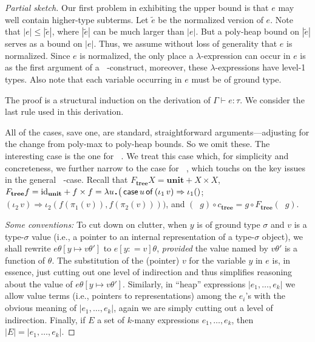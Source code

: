 \documentclass[envcountsame]{llncs}
\newcommand{\safe}[1]{#1^{\mathsf{S}}}
\newcommand{\key}[1]{\ensuremath{\mathop{\mathsf{#1}}\nolimits}\xspace}
\newcommand{\Case}{\key{case}}
\newcommand{\Of}{\key{of}}
\newcommand{\folds}[1]{\mathop{\safe{\mathsf{fold}}_{#1}}}
\newcommand{\type}[1]{\ensuremath{\mathbf{#1}}\xspace}
\newcommand{\Tree}{\type{tree}}
\newcommand{\Unit}{\ensuremath{\mathbf{unit}}\xspace}
\newcommand{\id}{\mathrm{id}}
\newcommand{\asize}[1]{\ensuremath{\mathopen{|}#1\mathclose{|}}\xspace}
\renewcommand{\gets}{\ensuremath{\mathrel{\colon=}}\xspace}
\newcommand{\entails}{\vdash}
\newcommand{\sqdot}{\rule{0.5mm}{0.5mm}}
\newcommand{\lam}[1]{\lambda #1\,\sqdot\,}
\newcommand{\of}{\colon}
\renewcommand{\colon}{\mathpunct{:}}
\begin{document}
\begin{proof}[Partial sketch]
Our first problem in exhibiting the upper bound is that $e$ may well 
contain higher-type subterms.  
Let $\tilde{e}$ be the normalized version of $e$.  Note
that $|e|\leq |\tilde{e}|$, where $|\tilde{e}|$ can be much larger
than $|e|$.  But a poly-heap bound on $|\tilde{e}|$ serves as a
bound on $|e|$.  Thus, we assume without loss of generality that
$e$ is normalized.
Since $e$ is normalized, the only place a $\lambda$-expression can 
occur in $e$ is
as the first argument of a $\folds{}$-construct, moreover, these
$\lambda$-expressions have level-1 types.
Also note that each variable occurring in $e$ must be of ground type.

The proof is a structural induction on the derivation of 
$\Gamma\entails e\of\tau$.  We consider the last rule
used in this derivation.  

All of the cases, save one, are standard, straightforward arguments---adjusting for the change from poly-max to poly-heap 
bounds.  So we omit these. The interesting case is the one for 
$\folds{\sigma}$.  We treat this case which, for simplicity 
and concreteness, we further narrow to the case for
$\folds{\Tree}$, which 
touchs on the key issues in the general $\folds{\sigma}$-case.
Recall that
$F_\Tree X = \Unit + X \times X$, \
$F_\Tree f = \id_{\Unit} + f\times f
= \lam{u}\big(\Case u \Of\,(\iota_1\, v) \Rightarrow \iota_1()$; 
$(\iota_2\, v) \Rightarrow \iota_2(f(\pi_1(v)),f(\pi_2(v)))\big)$,
and $(\folds{\Tree} g)\circ c_\Tree = g \circ F_\Tree(\folds\Tree g)$. 


\emph{Some conventions:}  To cut down on clutter, 
when $y$ is of ground type $\sigma$ and $v$ is a type-$\sigma$
value  (i.e., a pointer to an internal representation of 
a type-$\sigma$ object), we shall rewrite 
$e\theta[y\mapsto v\theta']$ to $e[y\gets v]\theta$, 
\emph{provided} the value named by $v\theta'$ is a function
of $\theta$.  The substitution of the (pointer) $v$ for
the variable $y$ in $e$ is, in essence, just cutting out
one level of indirection and thus simplifies reasoning about
the value of $e\theta[y\mapsto v\theta']$.
Similarly, in ``heap'' expressions $\asize{e_1,\dots,e_k}$
we allow value terms (i.e., pointers to representations) 
among the $e_i$'s with the obvious meaning of 
$\asize{e_1,\dots,e_k}$, again we are simply cutting out a
level of indirection.  Finally, if $E$ a set of $k$-many
expressions $e_1,\dots,e_k$, then 
$\asize{E} = \asize{e_1,\dots,e_k}$.






\end{proof}
\end{document}
